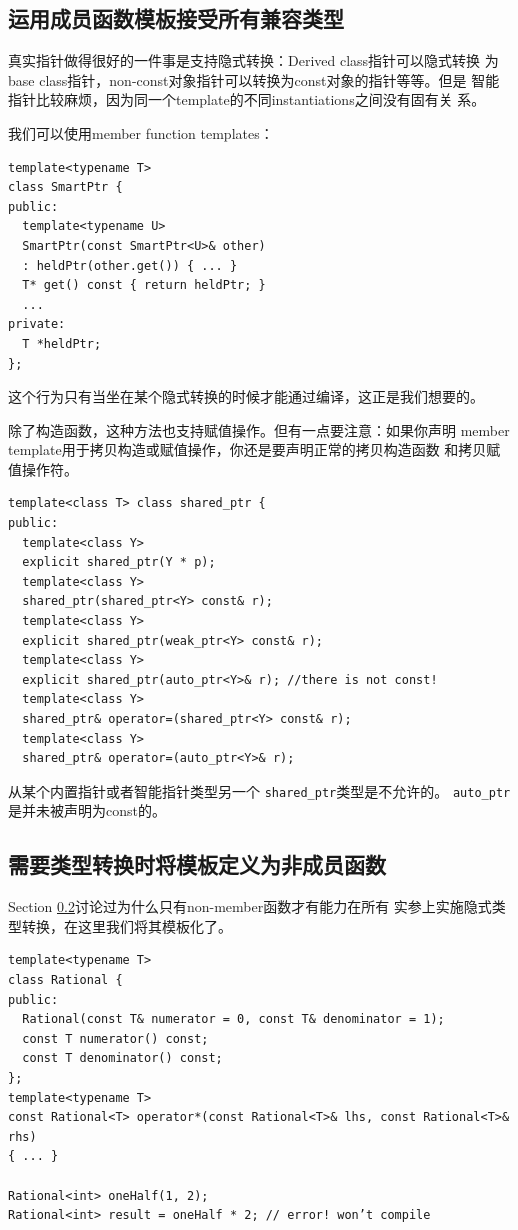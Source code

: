 \documentclass[a4paper,twoside]{article}
\theoremstyle{definition}
\theoremstyle{remark}
\numberwithin{equation}{section}
\let\OldTexttt\texttt
\renewcommand{\texttt}[1]{{\color{blue} \OldTexttt{#1}}}
\begin{document}
\subsection{运用成员函数模板接受所有兼容类型}
\label{sec:Item-45}

真实指针做得很好的一件事是支持隐式转换：Derived class指针可以隐式转换
为base class指针，non-const对象指针可以转换为const对象的指针等等。但是
智能指针比较麻烦，因为同一个template的不同instantiations之间没有固有关
系。

我们可以使用member function templates：
\begin{verbatim}
template<typename T>
class SmartPtr {
public:
  template<typename U>
  SmartPtr(const SmartPtr<U>& other)
  : heldPtr(other.get()) { ... } 
  T* get() const { return heldPtr; }
  ...
private:
  T *heldPtr;
};
\end{verbatim}
这个行为只有当坐在某个隐式转换的时候才能通过编译，这正是我们想要的。

除了构造函数，这种方法也支持赋值操作。但有一点要注意：如果你声明
member template用于拷贝构造或赋值操作，你还是要声明正常的拷贝构造函数
和拷贝赋值操作符。
\begin{verbatim}
template<class T> class shared_ptr {
public:
  template<class Y> 
  explicit shared_ptr(Y * p);
  template<class Y> 
  shared_ptr(shared_ptr<Y> const& r); 
  template<class Y> 
  explicit shared_ptr(weak_ptr<Y> const& r);
  template<class Y>
  explicit shared_ptr(auto_ptr<Y>& r); //there is not const!
  template<class Y>
  shared_ptr& operator=(shared_ptr<Y> const& r);
  template<class Y> 
  shared_ptr& operator=(auto_ptr<Y>& r); 
\end{verbatim}
从某个内置指针或者智能指针类型另一个\texttt{shared\_ptr}类型是不允许的。
\texttt{auto\_ptr}是并未被声明为const的。

\subsection{需要类型转换时将模板定义为非成员函数}
\label{sec:Item-46}

Section \ref{sec:Item-46}讨论过为什么只有non-member函数才有能力在所有
实参上实施隐式类型转换，在这里我们将其模板化了。

\begin{verbatim}
template<typename T>
class Rational {
public:
  Rational(const T& numerator = 0, const T& denominator = 1); 
  const T numerator() const; 
  const T denominator() const;
};
template<typename T>
const Rational<T> operator*(const Rational<T>& lhs, const Rational<T>& rhs)
{ ... }

Rational<int> oneHalf(1, 2); 
Rational<int> result = oneHalf * 2; // error! won’t compile
\end{verbatim}
\end{document}

